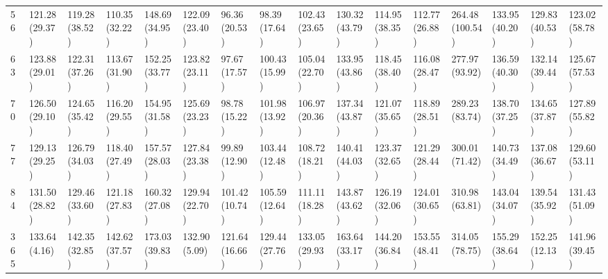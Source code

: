 \begin{tabular}{llllllllllllllll}
56  &  121.28 (29.37) &  119.28 (38.52) &  110.35 (32.22) &  148.69 (34.95) &  122.09 (23.40) &   96.36 (20.53) &   98.39 (17.64) &  102.43 (23.65) &  130.32 (43.79) &  114.95 (38.35) &  112.77 (26.88) &  264.48 (100.54) &  133.95 (40.20) &  129.83 (40.53) &  123.02 (58.78) \\
63  &  123.88 (29.01) &  122.31 (37.26) &  113.67 (31.90) &  152.25 (33.77) &  123.82 (23.11) &   97.67 (17.57) &  100.43 (15.99) &  105.04 (22.70) &  133.95 (43.86) &  118.45 (38.40) &  116.08 (28.47) &   277.97 (93.92) &  136.59 (40.30) &  132.14 (39.44) &  125.67 (57.53) \\
70  &  126.50 (29.10) &  124.65 (35.42) &  116.20 (29.55) &  154.95 (31.58) &  125.69 (23.23) &   98.78 (15.22) &  101.98 (13.92) &  106.97 (20.36) &  137.34 (43.87) &  121.07 (35.65) &  118.89 (28.51) &   289.23 (83.74) &  138.70 (37.25) &  134.65 (37.87) &  127.89 (55.82) \\
77  &  129.13 (29.25) &  126.79 (34.03) &  118.40 (27.49) &  157.57 (28.03) &  127.84 (23.38) &   99.89 (12.90) &  103.44 (12.48) &  108.72 (18.21) &  140.41 (44.03) &  123.37 (32.65) &  121.29 (28.44) &   300.01 (71.42) &  140.73 (34.49) &  137.08 (36.67) &  129.60 (53.11) \\
84  &  131.50 (28.82) &  129.46 (33.60) &  121.18 (27.83) &  160.32 (27.08) &  129.94 (22.70) &  101.42 (10.74) &  105.59 (12.64) &  111.11 (18.28) &  143.87 (43.62) &  126.19 (32.06) &  124.01 (30.65) &   310.98 (63.81) &  143.04 (34.07) &  139.54 (35.92) &  131.43 (51.09) \\
365 &   133.64 (4.16) &  142.35 (32.85) &  142.62 (37.57) &  173.03 (39.83) &   132.90 (5.09) &  121.64 (16.66) &  129.44 (27.76) &  133.05 (29.93) &  163.64 (33.17) &  144.20 (36.84) &  153.55 (48.41) &   314.05 (78.75) &  155.29 (38.64) &  152.25 (12.13) &  141.96 (39.45) \\
\bottomrule
\end{tabular}
